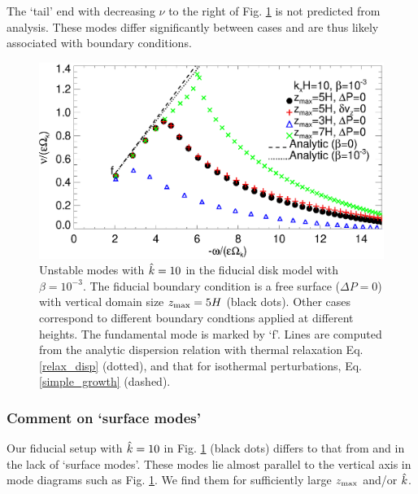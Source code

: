 The `tail' end with decreasing $\nu$ to the right of
Fig. \ref{compare_modes_iso_kx10} is not predicted from
analysis. These modes differ significantly between cases and are thus
likely associated with boundary conditions. %

\begin{figure}
  \includegraphics[width=\linewidth]{figures/compare_modes_iso_kx10_analytic.ps}
  \caption{Unstable modes with $\hat{k}=10$ in the fiducial disk model
    with $\beta=10^{-3}$. %
    The fiducial boundary condition is a free surface ($\Delta P=0$)
    with vertical domain size $z_\mathrm{max}=5H$  (black dots).  Other
    cases correspond to different boundary condtions applied at
    different heights. The fundamental mode is marked by `f'. Lines
    are computed from the analytic dispersion relation 
    with thermal relaxation Eq. \ref{relax_disp} (dotted), and that for
    isothermal perturbations, Eq. \ref{simple_growth} (dashed). 
    \label{compare_modes_iso_kx10} 
  }
\end{figure}

\subsubsection{Comment on `surface modes'}\label{surf_comment}
Our fiducial setup with $\hat{k}=10$ in 
Fig. \ref{compare_modes_iso_kx10} (black dots) differs to that from
\cite{nelson13} and \cite{mcnally14} in the lack of `surface modes'. 
These modes lie almost parallel to the vertical axis in mode 
diagrams such as Fig. \ref{compare_modes_iso_kx10}. We find them for 
sufficiently large $z_\mathrm{max}$ and/or $\hat{k}$. %

